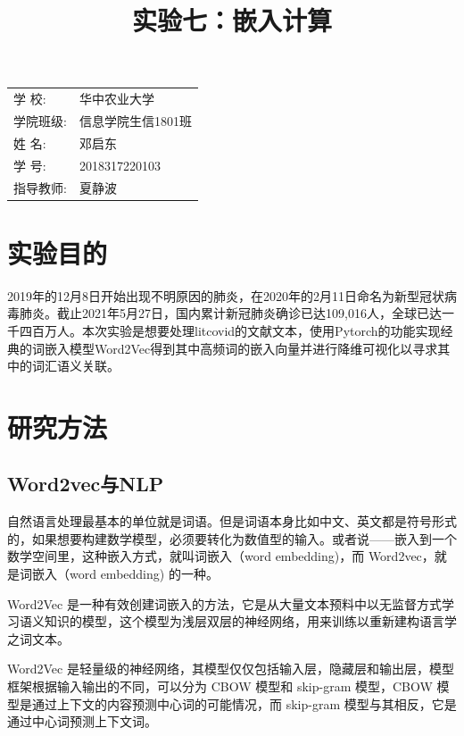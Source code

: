 \documentclass[12pt]{article}
\title{\heiti 实验七：嵌入计算}
\begin{document}
	\maketitle
	
	\vspace{5cm}
	
	\begin{table}[h]
		\centering
		\begin{Large}
			\begin{tabular}{p{3cm} p{7cm}<{\centering}}
				学  \qquad  校: &  华中农业大学     \\ \cline{2-2}
				学院班级:      & 信息学院生信1801班   \\ \cline{2-2}
				姓  \qquad  名: & 邓启东 \\ \cline{2-2}
				学  \qquad  号: & 2018317220103 \\ \cline{2-2}
				指导教师:       &夏静波 \\ \cline{2-2}
			\end{tabular}
		\end{Large}		
	\end{table}
	
	\newpage%

	\tableofcontents
	
	\newpage
	\section{实验目的}
2019年的12月8日开始出现不明原因的肺炎，在2020年的2月11日命名为新型冠状病毒肺炎。截止2021年5月27日，国内累计新冠肺炎确诊已达109,016人，全球已达一千四百万人。本次实验是想要处理litcovid的文献文本，使用Pytorch的功能实现经典的词嵌入模型Word2Vec得到其中高频词的嵌入向量并进行降维可视化以寻求其中的词汇语义关联。

\section{研究方法}
\subsection{Word2vec与NLP}
自然语言处理最基本的单位就是词语。但是词语本身比如中文、英文都是符号形式的，如果想要构建数学模型，必须要转化为数值型的输入。或者说——嵌入到一个数学空间里，这种嵌入方式，就叫词嵌入（word embedding)，而 Word2vec，就是词嵌入（word embedding) 的一种。\par
Word2Vec 是一种有效创建词嵌入的方法，它是从大量文本预料中以无监督方式学习语义知识的模型，这个模型为浅层双层的神经网络，用来训练以重新建构语言学之词文本。\par
Word2Vec 是轻量级的神经网络，其模型仅仅包括输入层，隐藏层和输出层，模型框架根据输入输出的不同，可以分为 CBOW 模型和 skip-gram 模型，CBOW 模型是通过上下文的内容预测中心词的可能情况，而 skip-gram 模型与其相反，它是通过中心词预测上下文词。\par
\end{document}
